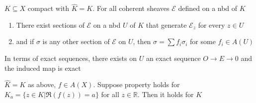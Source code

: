 \documentclass[../main.tex]{subfiles}
\begin{document}
\begin{theorem}
$K\subseteq X$ compact with $\widehat K=K$. For all coherent sheaves $\mathcal E$ defined on a nbd of $K$
\begin{enumerate}
\item There exist sections of $\mathcal E$ on a nbd $U$ of $K$ that generate $\mathcal E_z$ for every $z\in U$
\item and if $\sigma$ is any other section of $\mathcal E$ on $U$, then $\sigma=\sum f_i\sigma_i$ for some $f_i\in A(U)$
\end{enumerate}
In terms of exact sequences, there exists on $U$ an exact sequence $O\to E\to0$ and the induced map  is exact
\end{theorem}

\begin{lemma}
$\widehat K=K$ as above, $f\in A(X)$. Suppose property holds for $K_a=\{z\in K|\Re(f(z))=a\}$ for all $z\in\mathbb R$. Then it holds for $K$
\end{lemma}
\end{document}
